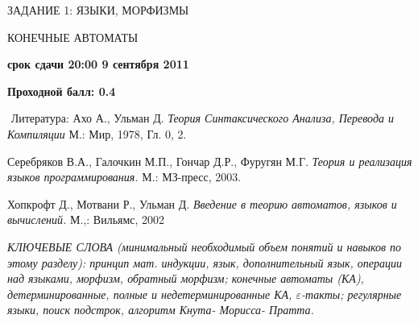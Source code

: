 \documentclass[10pt,twocolumn]{article}
\let\eps\varepsilon
\begin{document}
\centerline{ЗАДАНИЕ 1: ЯЗЫКИ, МОРФИЗМЫ}
\centerline{КОНЕЧНЫЕ АВТОМАТЫ}
\centerline{{\bf срок сдачи 20:00  9 сентября 2011}}

\centerline{{\bf Проходной балл: 0.4}}

{\footnotesize$ $
Литература: 
 Ахо А., Ульман Д. 
{\it Теория Синтаксического Анализа, Перевода и Компиляции}  М.: Мир, 1978, Гл. 0, 2.

Серебряков В.А., Галочкин М.П., Гончар Д.Р., Фуругян М.Г.
{\em Теория и реализация языков программирования.} М.: МЗ-пресс, 2003.

Хопкрофт Д., Мотвани Р., Ульман Д. 
{\em Введение в теорию автоматов, языков и вычислений.} М.,: Вильямс, 2002


{\em КЛЮЧЕВЫЕ СЛОВА (минимальный необходимый объем понятий и навыков по
этому разделу): принцип мат. индукции, язык, дополнительный язык,
операции над языками, морфизм,
обратный морфизм;  
конечные автоматы (КА), детерминированные, полные и недетерминированные КА, $\eps$-такты; регулярные языки,
поиск подстрок, алгоритм Кнута- Морисса- Пратта.

}
}

\smallskip
\end{document}
